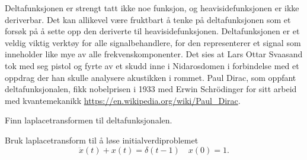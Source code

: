 \documentclass[a4paper,norsk,11pt]{interaktiv}
\begin{document}
Deltafunksjonen er strengt tatt ikke noe funksjon,
og heavisidefunksjonen er ikke deriverbar. 
Det kan allikevel være fruktbart å tenke på deltafunksjonen
som et forsøk på å sette opp den deriverte til heavisidefunksjonen.
Deltafunksjonen er et veldig viktig verktøy for alle signalbehandlere, 
for den representerer et signal som inneholder like mye av alle frekvenskomponenter. 
Det sies at Lars Ottar Svaasand tok med seg pistol og fyrte av et skudd inne i Nidarosdomen i forbindelse med et oppdrag der han skulle analysere akustikken i rommet. 
Paul Dirac, som oppfant deltafunksjonalen, fikk nobelprisen i 1933 med Erwin Schrödinger for sitt arbeid med kvantemekanikk \url{https://en.wikipedia.org/wiki/Paul_Dirac}.


\begin{oppgave}{7}
Finn laplacetransformen til deltafunksjonalen.
\end{oppgave}


\begin{oppgave}{8}
Bruk laplacetransform til å løse initialverdiproblemet
\[
\ddot{x}(t)+x(t)=\delta(t-1) \quad x(0)=1.
\]
\end{oppgave}
\end{document}
